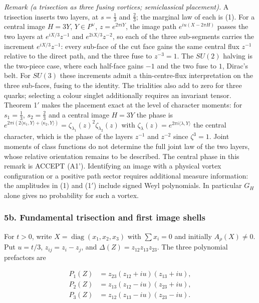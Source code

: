 \documentclass[11pt,a4paper]{article}
\begin{document}
\emph{Remark (a trisection as three fusing vortices; semiclassical
placement).} A trisection inserts two layers, at \(s=\frac13\) and
\(\frac23\); the marginal law of each is (1). For a central image
\(H=3Y\), \(Y\in P^\vee\), \(z=e^{2\pi iY}\), the image path
\(e^{iu(X-2\pi H)}\) passes the two layers at \(e^{iX/3}z^{-1}\) and
\(e^{2iX/3}z^{-2}\), so each of the three sub-segments carries the
increment \(e^{iX/3}z^{-1}\): every sub-face of the cut face gains the
same central flux \(z^{-1}\) relative to the direct path, and the three
fuse to \(z^{-3}=1\). The \(SU(2)\) halving is the two-piece case, where
each half-face gains \(-1\) and the two fuse to \(1\), Dirac's belt. For
\(SU(3)\) these increments admit a thin-centre-flux interpretation on
the three sub-faces, fusing to the identity. The trialities also add to
zero for three quarks; selecting a colour singlet additionally requires
an invariant tensor. Theorem 1\('\) makes the placement exact at the
level of character moments: for \(s_1=\frac13\), \(s_2=\frac23\) and a
central image \(H=3Y\) the phase is
\(e^{2\pi i(2\langle\kappa_1,Y\rangle+\langle\kappa_2,Y\rangle)}=\zeta_{\lambda_1}(z)^2\zeta_{\lambda_2}(z)\)
with \(\zeta_\lambda(z)=e^{2\pi i\langle\lambda,Y\rangle}\) the central
character, which is the phase of the layers \(z^{-1}\) and \(z^{-2}\)
since \(\zeta^3=1\). Joint moments of class functions do not determine
the full joint law of the two layers, whose relative orientation remains
to be described. The central phase in this remark is ACCEPT (A1').
Identifying an image with a physical vortex configuration or a positive
path sector requires additional measure information: the amplitudes in
(1) and (1\('\)) include signed Weyl polynomials. In particular \(G_H\)
alone gives no probability for such a vortex.

\hypertarget{b.-fundamental-trisection-and-first-image-shells}{%
\subsubsection{5b. Fundamental trisection and first image
shells}\label{b.-fundamental-trisection-and-first-image-shells}}

For \(t>0\), write \(X=\operatorname{diag}(x_1,x_2,x_3)\) with
\(\sum x_i=0\) and initially \(A_\rho(X)\ne0\). Put \(u=t/3\),
\(z_{ij}=z_i-z_j\), and \(\Delta(Z)=z_{12}z_{13}z_{23}\). The three
polynomial prefactors are

\[\begin{aligned}
P_1(Z)&=z_{23}(z_{12}+iu)(z_{13}+iu),\\
P_2(Z)&=z_{13}(z_{12}-iu)(z_{23}+iu),\\
P_3(Z)&=z_{12}(z_{13}-iu)(z_{23}-iu).
\end{aligned}\tag{2}\]
\end{document}
